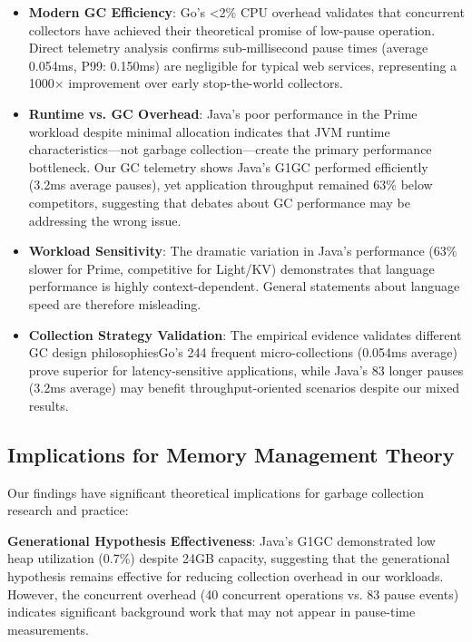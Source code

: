 \documentclass{article}
\begin{document}
\begin{itemize}
    \item \textbf{Modern GC Efficiency}: Go's <2\% CPU overhead validates that concurrent collectors have achieved their theoretical promise of low-pause operation. Direct telemetry analysis confirms sub-millisecond pause times (average 0.054ms, P99: 0.150ms) are negligible for typical web services, representing a 1000$\times$ improvement over early stop-the-world collectors.
    
    \item \textbf{Runtime vs. GC Overhead}: Java's poor performance in the Prime workload despite minimal allocation indicates that JVM runtime characteristics—not garbage collection—create the primary performance bottleneck. Our GC telemetry shows Java's G1GC performed efficiently (3.2ms average pauses), yet application throughput remained 63\% below competitors, suggesting that debates about GC performance may be addressing the wrong issue.
    
    \item \textbf{Workload Sensitivity}: The dramatic variation in Java's performance (63\% slower for Prime, competitive for Light/KV) demonstrates that language performance is highly context-dependent. General statements about language speed are therefore misleading.
    
    \item \textbf{Collection Strategy Validation}: The empirical evidence validates different GC design philosophies\textemdash Go's 244 frequent micro-collections (0.054ms average) prove superior for latency-sensitive applications, while Java's 83 longer pauses (3.2ms average) may benefit throughput-oriented scenarios despite our mixed results.
\end{itemize}

\subsection{Implications for Memory Management Theory}

Our findings have significant theoretical implications for garbage collection research and practice:

\textbf{Generational Hypothesis Effectiveness}: Java's G1GC demonstrated low heap utilization (0.7\%) despite 24GB capacity, suggesting that the generational hypothesis remains effective for reducing collection overhead in our workloads. However, the concurrent overhead (40 concurrent operations vs. 83 pause events) indicates significant background work that may not appear in pause-time measurements.
\end{document}
